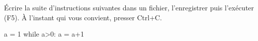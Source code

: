 \'Ecrire la suite d'instructions suivantes dans un fichier, l'enregistrer puis l'exécuter (F5). \`A l'instant qui vous convient, presser Ctrl+C.
\begin{pyverbatim}
a = 1
while a>0:
    a = a+1
\end{pyverbatim}
